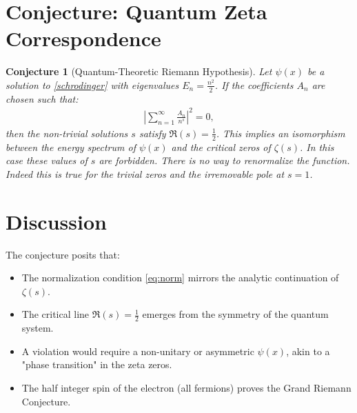 \documentclass[10pt, oneside]{article}
\newtheorem{conjecture}{Conjecture}
\begin{document}
\section{Conjecture: Quantum Zeta Correspondence}
\begin{conjecture}[Quantum-Theoretic Riemann Hypothesis]
  Let $\psi(x)$ be a solution to \eqref{schrodinger} with eigenvalues $E_n = \frac{n^2}{2}$. If the coefficients $A_n$ are chosen such that:
  \begin{align}
    |\sum_{n=1}^\infty \frac{A_n}{n^s}|^2 = 0, \label{eq:zeta}
  \end{align}
  then the non-trivial solutions $s$ satisfy $\Re(s) = \frac{1}{2}$. This implies an isomorphism between the energy spectrum of $\psi(x)$ and the critical zeros of $\zeta(s)$.
  In this case these values of $s$ are forbidden. There is no way to renormalize the function. Indeed this is true for the trivial zeros and the irremovable pole at $s=1$.
\end{conjecture}

\section{Discussion}
The conjecture posits that:
\begin{itemize}
  \item The normalization condition \eqref{eq:norm} mirrors the analytic continuation of $\zeta(s)$.
  \item The critical line $\Re(s) = \frac{1}{2}$ emerges from the symmetry of the quantum system.
  \item A violation would require a non-unitary or asymmetric $\psi(x)$, akin to a "phase transition" in the zeta zeros.
  \item The half integer spin of the electron (all fermions) proves the Grand Riemann Conjecture. 
\end{itemize}



\end{document}
